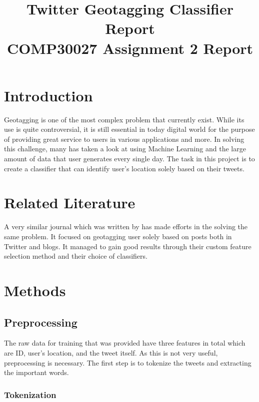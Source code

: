\documentclass[11pt]{article}
\title{%
  Twitter Geotagging Classifier Report\\
  \large COMP30027 Assignment 2 Report}
\begin{document}
\maketitle

\section{Introduction}

Geotagging is one of the most complex problem that currently exist. While its
use is quite controversial, it is still essential in today digital world
for the purpose of providing great service to users in various applications and
more. In solving this challenge, many has taken a look at using Machine Learning
and the large amount of data that user generates every single day. The task in
this project is to create a classifier that can identify user's location solely based on their tweets.


\section{Related Literature}

A very similar journal which was written by  has made efforts
in the solving the same problem. It focused on
geotagging user solely based on posts both in Twitter and blogs. It managed
to gain good results through their custom feature selection method and
their choice of classifiers.


\section{Methods}

\subsection{Preprocessing}

The raw data for training that was provided have three features in total which are ID, user's
location, and the tweet itself. As this is not very useful, preprocessing is
necessary. The first step is to tokenize the tweets and extracting the important words.

\subsubsection{Tokenization}
\end{document}
